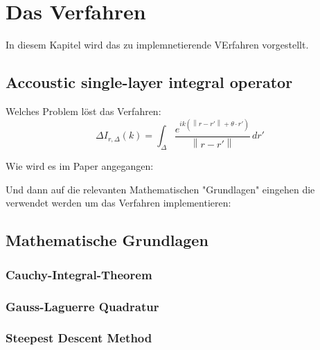 \chapter{Das Verfahren}

In diesem Kapitel wird das zu implemnetierende VErfahren vorgestellt.
\section{Accoustic single-layer integral operator}

Welches Problem löst das Verfahren:
\begin{equation*}
    \Delta
    I_{r,\Delta}(k) = \int_{\Delta}^{}  \frac{e^{ik(\left\lVert r-r'\right\rVert + \theta \cdot r')}}{\left\lVert r-r'\right\rVert} \,dr'
\end{equation*}

Wie wird es im Paper angegangen:

Und dann auf die relevanten Mathematischen "Grundlagen" eingehen die verwendet werden um das Verfahren implementieren:

\section{Mathematische Grundlagen}
\subsection{Cauchy-Integral-Theorem}



\subsection{Gauss-Laguerre Quadratur}

\subsection{Steepest Descent Method}



